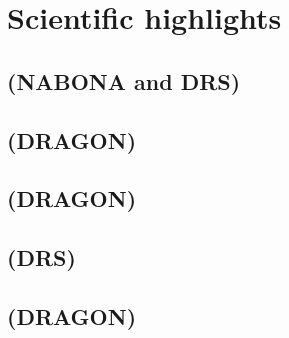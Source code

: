 \section{Scientific highlights}

\subsection{ (NABONA and DRS) }

\subsection{ (DRAGON)}


\subsection{ (DRAGON)}


\subsection{ (DRS) }


\subsection{ (DRAGON)}

